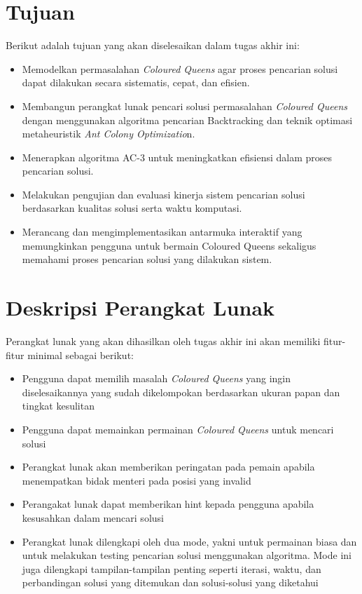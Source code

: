 \documentclass[12pt,a4paper]{article}
\begin{document}
	\section*{Tujuan}
	Berikut adalah tujuan yang akan diselesaikan dalam tugas akhir ini:
	\begin{itemize}	
		\item Memodelkan permasalahan \textit{Coloured Queens} agar proses pencarian solusi dapat dilakukan secara sistematis, cepat, dan efisien.
		
		\item Membangun perangkat lunak pencari solusi permasalahan \textit{Coloured Queens} dengan menggunakan algoritma pencarian Backtracking dan teknik optimasi metaheuristik \textit{Ant Colony Optimizatio}n.
		
		\item Menerapkan algoritma AC-3 untuk meningkatkan efisiensi dalam proses pencarian solusi.
		
		\item Melakukan pengujian dan evaluasi kinerja sistem pencarian solusi berdasarkan kualitas solusi serta waktu komputasi.
		
		\item Merancang dan mengimplementasikan antarmuka interaktif yang memungkinkan pengguna untuk bermain Coloured Queens sekaligus memahami proses pencarian solusi yang dilakukan sistem.
	\end{itemize}
	
	\section*{Deskripsi Perangkat Lunak}
	Perangkat lunak yang akan dihasilkan oleh tugas akhir ini akan memiliki fitur-fitur minimal sebagai berikut: 
	\begin{itemize}
		\item Pengguna dapat memilih masalah \textit{Coloured Queens} yang ingin diselesaikannya yang sudah dikelompokan berdasarkan ukuran papan dan tingkat kesulitan
		\item Pengguna dapat memainkan permainan \textit{Coloured Queens} untuk mencari solusi
		\item Perangkat lunak akan memberikan peringatan pada pemain apabila menempatkan bidak menteri pada posisi yang invalid
		\item Perangakat lunak dapat memberikan hint kepada pengguna apabila kesusahkan dalam mencari solusi
		\item Perangkat lunak dilengkapi oleh dua mode, yakni untuk permainan biasa dan untuk melakukan testing pencarian solusi menggunakan algoritma. Mode ini juga dilengkapi tampilan-tampilan penting seperti iterasi, waktu, dan perbandingan solusi yang ditemukan dan solusi-solusi yang diketahui
	\end{itemize}
	
\end{document}

